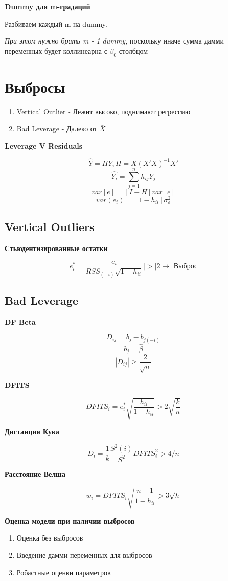 \documentclass[a4paper, 12pt]{article}
\begin{document}
\textbf{Dummy для m-градаций}

Разбиваем каждый m на dummy. 

\textit{При этом нужно брать m - 1 dummy,} поскольку
иначе сумма дамми переменных будет коллинеарна с $\beta_0$
столбцом

\section{Выбросы}

\begin{enumerate}
    \item Vertical Outlier - Лежит высоко, поднимают регрессию
    \item Bad Leverage - Далеко от $\bar{X}$
\end{enumerate}

\textbf{Leverage V Residuals}

\[\hat{Y} = HY, H = X(X'X)^{-1}X'\]
\[\hat{Y_i} = \sum_{j = 1}^n h_{ij}Y_j\]
\[var[e] = [I - H]var[e]\]
\[var(e_i) = [1 - h_{ii}]\sigma_{\varepsilon}^2\]

\subsection{Vertical Outliers}

\textbf{Стьюдентизированные остатки}

\[e^{*}_i = \frac{e_i}{RSS_{(-i)}\sqrt{1 - h_{ii}}} |>| 2 \rightarrow \textrm{ Выброс}\]

\subsection{Bad Leverage}

\textbf{DF Beta}

\[D_{ij} = b_j - b_{j(-i)}\]
\[b_j = \hat{\beta}\]
\[|D_{ij}| \geq \frac{2}{\sqrt{n}}\]

\textbf{DFITS}

\[DFITS_i = e^{*}_i\sqrt{\frac{h_{ii}}{1 - h_{ii}}} > 2\sqrt{\frac{k}{n}}\]

\textbf{Дистанция Кука}

\[D_i = \frac{1}{k} \frac{S^{2}(i)}{S^{2}}DFITS_i^2 > 4/n\]

\textbf{Расстояние Велша}

\[w_i = DFITS_i\sqrt{\frac{n - 1}{1 - h_{ii}}} > 3\sqrt{h}\]

\textbf{Оценка модели при наличии выбросов}

\begin{enumerate}
    \item Оценка без выбросов
    \item Введение дамми-переменных для выбросов
    \item Робастные оценки параметров
\end{enumerate}
\end{document}
